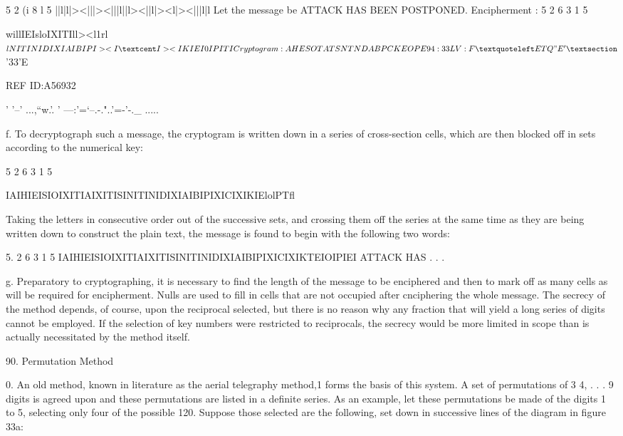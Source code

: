 { 

 

5 2 (i 8 l 5
||l|l|><|||><|||l||l><||l|><l|><|||l|l
Let the message be ATTACK HAS BEEN POSTPONED.
Encipherment :
5 2 6 3 1 5

 

willIEIsloIXITIll><l1rl$lNITINIDIXIAIBIPI><I¢I><IKIEI0IPITI
Cryptogram:
AHESO TATSN TNDAB PCKEO PE

94

 

:33 L V:

F‘ ETQ"E'§$'33’E

 

 

REF ID:A56932

' '--' ...,“w.'. ' ---:'=‘--.-."..'=-'-._ .....

 

f. To decryptograph such a message, the cryptogram is written down
in a series of cross-section cells, which are then blocked off in sets
according to the numerical key:

5 2 6 3 1 5

IAIHIEISIOIXITIAIXITISINITINIDIXIAIBIPIXICIXIKIElolPTﬂ

Taking the letters in consecutive order out of the successive sets, and
crossing them off the series at the same time as they are being written
down to construct the plain text, the message is found to begin with
the following two words:

5. 2 6 3 1 5
IAIHIEISIOIXITIAIXITISINITINIDIXIAIBIPIXICIXIKTEIOIPIEI
ATTACK HAS . . .

g. Preparatory to cryptographing, it is necessary to ﬁnd the length
of the message to be enciphered and then to mark off as many cells as
will be required for encipherment. Nulls are used to ﬁll in cells that
are not occupied after cnciphering the whole message. The secrecy of
the method depends, of course, upon the reciprocal selected, but there
is no reason why any fraction that will yield a long series of digits
cannot be employed. If the selection of key numbers were restricted
to reciprocals, the secrecy would be more limited in scope than is actually
necessitated by the method itself.

 

 

90. Permutation Method

0. An old method, known in literature as the aerial telegraphy method,1
forms the basis of this system. A set of permutations of 3 4, . . .
9 digits is agreed upon and these permutations are listed in a deﬁnite
series. As an example, let these permutations be made of the digits 1
to 5, selecting only four of the possible 120. Suppose those selected
are the following, set down in successive lines of the diagram in
ﬁgure 33a:

}
